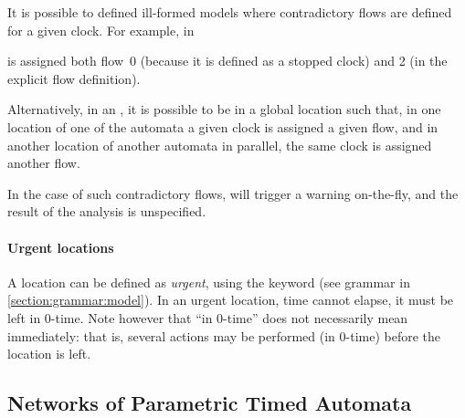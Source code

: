 \begin{remark}
	It is possible to defined ill-formed models where contradictory flows are defined for a given clock.
	For example, in


	\noindent
	 is assigned both flow~0 (because it is defined as a stopped clock) and 2 (in the explicit flow definition).

	Alternatively, in an \NIPTA{}, it is possible to be in a global location such that, in one location of one of the automata a given clock is assigned a given flow, and in another location of another automata in parallel, the same clock is assigned another flow.

	In the case of such contradictory flows, \imitator{} will trigger a warning on-the-fly, and the result of the analysis is unspecified.
\end{remark}



\paragraph{Urgent locations}
A location can be defined as \emph{urgent}, using the keyword  (see grammar in  \cref{section:grammar:model}).
In an urgent location, time cannot elapse, \ie{} it must be left in $0$-time.
Note however that ``in $0$-time'' does not necessarily mean immediately: that is, several actions may be performed (in $0$-time) before the location is left.





\subsection{Networks of \imitator{} Parametric Timed Automata}

